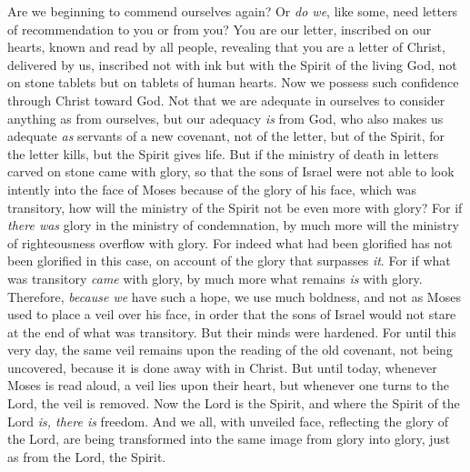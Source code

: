 \begin{biblechapter} %
 Are we beginning to commend ourselves again? Or \textit{do we}, like some, need letters of recommendation to you or from you?
\verse You are our letter, inscribed on our hearts, known and read by all people,
\verse revealing that you are a letter of Christ, delivered by us, inscribed not with ink but with the Spirit of the living God, not on stone tablets but on tablets of human hearts.
\verse Now we possess such confidence through Christ toward God.
\verse Not that we are adequate in ourselves to consider anything as from ourselves, but our adequacy \textit{is} from God,
\verse who also makes us adequate \textit{as} servants of a new covenant, not of the letter, but of the Spirit, for the letter kills, but the Spirit gives life.
\verse But if the ministry of death in letters carved on stone came with glory, so that the sons of Israel were not able to look intently into the face of Moses because of the glory of his face, which was transitory,
\verse how will the ministry of the Spirit not be even more with glory?
\verse For if \textit{there was} glory in the ministry of condemnation, by much more will the ministry of righteousness overflow with glory.
\verse For indeed what had been glorified has not been glorified in this case, on account of the glory that surpasses \textit{it}.
\verse For if what was transitory \textit{came} with glory, by much more what remains \textit{is} with glory.
\verse Therefore, \textit{because we} have such a hope, we use much boldness,
\verse and not as Moses used to place a veil over his face, in order that the sons of Israel would not stare at the end of what was transitory.
\verse But their minds were hardened. For until this very day, the same veil remains upon the reading of the old covenant, not being uncovered, because it is done away with in Christ.
\verse But until today, whenever Moses is read aloud, a veil lies upon their heart,
\verse but whenever one turns to the Lord, the veil is removed.
\verse Now the Lord is the Spirit, and where the Spirit of the Lord \textit{is, there is} freedom.
\verse And we all, with unveiled face, reflecting the glory of the Lord, are being transformed into the same image from glory into glory, just as from the Lord, the Spirit.
\end{biblechapter}

